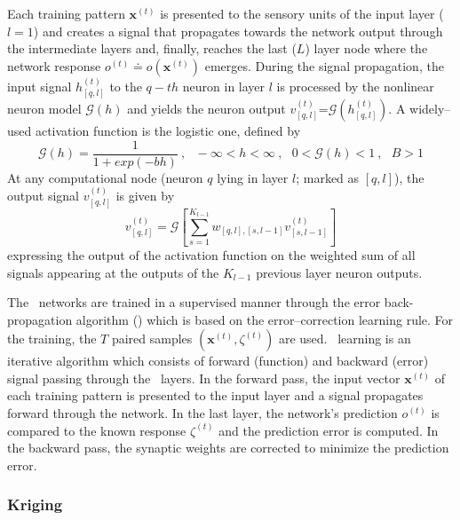 \documentclass{vki_ls}
\newcommand{\vect}[1]{\bm{#1}}
\newcommand{\set}[1]{\mathcal{#1}}
\begin{document}
Each training pattern $\vect{x}^{(t)}$ is presented to the sensory units of the input layer ($l\!=\!1$) and creates a signal that propagates towards the network output through the intermediate layers and, finally, reaches the last ($L$) layer node where the network response $o^{(t)}\!\doteq\!o(\vect{x}^{(t)})$ emerges. During the signal propagation, the input signal $h^{(t)}_{[q,l]}$ to the $q\!-\!th$ neuron in layer $l$ is processed by the nonlinear neuron model $\set{G}(h)$ and yields the neuron output $v^{(t)}_{[q,l]}$=$\set{G}(h^{(t)}_{[q,l]})$. A widely--used activation function is the logistic one, defined by
%
\begin{equation} \label{mlp_logistic}
   \set{G}(h)=\frac{1}{1+exp(-bh)}~,~~~-\infty\!<\!h\!<\!\infty~,~~~
   0\!<\!\set{G}(h)\!<\!1~,~~~B\!>\!1
\end{equation}
%
At any computational node (neuron $q$ lying in layer $l$; marked as $[q,l]$), the output signal $v^{(t)}_{[q,l]}$ is given by
%
\begin{equation} 
   v^{(t)}_{[q,l]}=
   \set{G} \left[ \sum_{s=1}^{K_{l-1}} w_{[q,l],[s,l-1]} v^{(t)}_{[s,l-1]} \right]
\end{equation}
%
expressing the output of the activation function on the weighted sum of all signals appearing at the outputs of the $K_{l-1}$ previous layer neuron outputs. 

The \MLP\ networks are trained in a supervised manner through the error back-propagation algorithm (\EBP) which is based on the error--correction learning rule. For the training, the $T$ paired samples $(\vect x^{(t)},\zeta^{(t)})$ are used. \EBP\ learning is an iterative algorithm which consists of forward (function) and backward (error) signal passing through the \MLP\ layers. In the forward pass, the input vector $\vect{x}^{(t)}$ of each training pattern is presented to the input layer and a signal propagates forward through the network. In the last layer, the network's prediction $o^{(t)}$ is compared to the known response $\zeta^{(t)}$ and the prediction error is computed. In the backward pass, the synaptic weights are corrected to minimize the prediction error.

\subsubsection*{Kriging}
\label{ss:krig}
\end{document}

